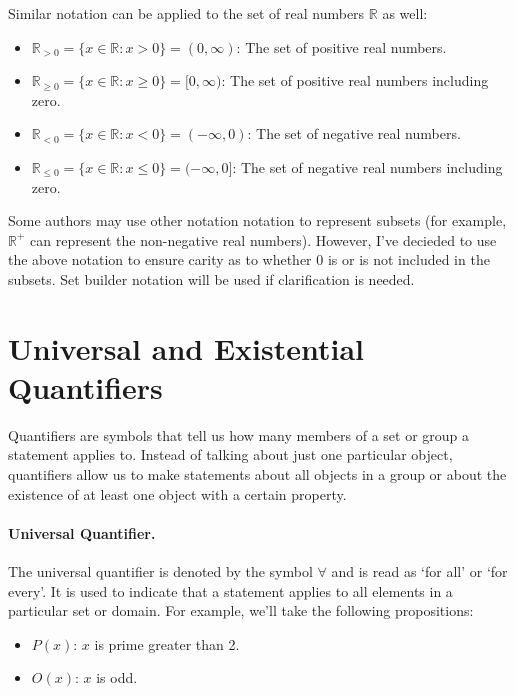 \documentclass[a4paper, twoside]{article}
\newcommand{\R}{\mathbb{R}}
\begin{document}
Similar notation can be applied to the set of real numbers \(\R\) as well:

\begin{itemize}
    \item \(\R_{> 0} = \{ x \in \R : x > 0 \} = (0, \infty)\): The set of positive real numbers.
    \item \(\R_{\geq 0} = \{ x \in \R : x \geq 0 \} = [0, \infty) \): The set of positive real numbers including zero.
    \item \(\R_{< 0} = \{ x \in \R : x < 0 \} = (-\infty, 0)\): The set of negative real numbers.
    \item \(\R_{\leq 0} = \{ x \in \R : x \leq 0 \} = (-\infty, 0]\): The set of negative real numbers including zero.
\end{itemize}

Some authors may use other notation notation to represent subsets (for example, \( \R^+ \) can represent the non-negative real numbers). However, I've decieded to use the above notation to ensure carity as to whether 0 is or is not included in the subsets. Set builder notation will be used if clarification is needed.

\newpage

\section{Universal and Existential Quantifiers}
Quantifiers are symbols that tell us how many members of a set or group a statement applies to. Instead of talking about just one particular object, quantifiers allow us to make statements about all objects in a group or about the existence of at least one object with a certain property.

\paragraph{Universal Quantifier.}
The universal quantifier is denoted by the symbol \(\forall\) and is read as `for all' or `for every'. It is used to indicate that a statement applies to all elements in a particular set or domain. For example, we'll take the following propositions:

\begin{itemize}
    \item \(P(x)\): \(x\) is prime greater than 2.
    \item \(O(x)\): \(x\) is odd.
\end{itemize}
\end{document}
